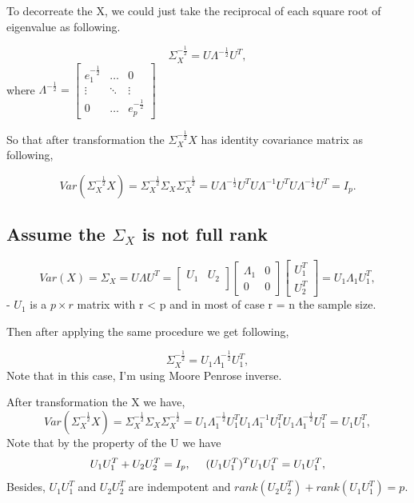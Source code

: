 \documentclass[]{article}
\begin{document}
To decorreate the X, we could just take the reciprocal of each square
root of eigenvalue as following.

\[
  \Sigma^{-\frac{1}{2}}_X = U\Lambda^{-\frac{1}{2}}U^T,
\] where
\(\Lambda^{-\frac{1}{2}} = \begin{bmatrix}  e_1^{-\frac{1}{2}} & \dots & 0 \\  \vdots & \ddots & \vdots \\  0 & \dots & e_p^{-\frac{1}{2}}  \end{bmatrix}\)

So that after transformation the \(\Sigma^{-\frac{1}{2}}_X X\) has
identity covariance matrix as following,

\[
  Var(\Sigma^{-\frac{1}{2}}_X X) = \Sigma^{-\frac{1}{2}}_X \Sigma_X\Sigma^{-\frac{1}{2}}_X = U\Lambda^{-\frac{1}{2}}U^T U\Lambda^{-1}U^T U\Lambda^{-\frac{1}{2}}U^T = I_p.
\]

\subsection{\texorpdfstring{Assume the \(\Sigma_X\) is not full
rank}{Assume the \textbackslash{}Sigma\_X is not full rank}}\label{assume-the-sigma_x-is-not-full-rank}

\[
  Var(X) = \Sigma_X = U\Lambda U^T =
                        \begin{bmatrix}
                         U_1 & U_2\\
                        \end{bmatrix}
                        \begin{bmatrix}
                        \Lambda_1 & 0\\
                        0 & 0
                        \end{bmatrix}
                        \begin{bmatrix}
                        U_1^T \\
                        U_2^T
                        \end{bmatrix} = U_1\Lambda_1U_1^T,
\] - \(U_1\) is a \(p \times r\) matrix with r \textless{} p and in most
of case r = n the sample size.

Then after applying the same procedure we get following,

\[
  \Sigma^{-\frac{1}{2}}_X = U_1\Lambda_1^{-\frac{1}{2}}U_1^T,
\] Note that in this case, I'm using Moore Penrose inverse.

After transformation the X we have, \[
  Var(\Sigma^{-\frac{1}{2}}_X X) = \Sigma^{-\frac{1}{2}}_X \Sigma_X\Sigma^{-\frac{1}{2}}_X = U_1\Lambda^{-\frac{1}{2}}_1U^T_1 U_1\Lambda^{-1}_1U^T_1 U_1\Lambda^{-\frac{1}{2}}_1U^T_1 = U_1U_1^T,  
\] Note that by the property of the U we have \[
  U_1U_1^T + U_2U_2^T = I_p, ~~~~~\\
  (U_1U_1^T)^T U_1U_1^T = U_1U_1^T,
\] Besides, \(U_1U_1^T\) and \(U_2U_2^T\) are indempotent and
\(rank(U_2U_2^T) + rank(U_1U_1^T) = p\).
\end{document}
